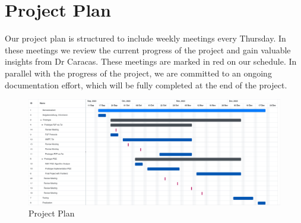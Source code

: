 \chapter{Project Plan}

Our project plan is structured to include weekly meetings every Thursday. In these meetings we review the current progress of the project and gain valuable insights from Dr Caracas. These meetings are marked in red on our schedule. In parallel with the progress of the project, we are committed to an ongoing documentation effort, which will be fully completed at the end of the project.

\begin{figure}[H]
    \centering
    \includegraphics[width=1\linewidth]{resources/projectplan.pdf}
    \caption{Project Plan}
    \label{fig:projectplan}
\end{figure}